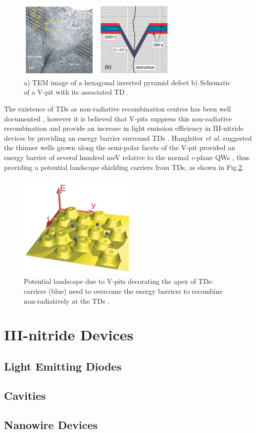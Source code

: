 \begin{figure}[h]
	\centering
	\includegraphics[width=0.7\textwidth]{Figs/Ch1/vpit.png}
	\caption {a) TEM image of a hexagonal inverted pyramid defect b) Schematic  of a V-pit with its associated TD \cite{Hangleiter2005}.}
	\label{1.8}
\end{figure}
\FloatBarrier 

The existence of TDs as non-radiative recombination centres has been well documented \cite{Bennett2010b}, however it is believed that V-pits suppress this non-radiative recombination and provide an increase in light emission efficiency in III-nitride devices by providing an energy barrier surround TDs \cite{Hangleiter2005}. Hangleiter {\it et al}. suggested the thinner wells grown along the semi-polar facets of the V-pit provided an energy barrier of several hundred meV relative to the normal {\it c}-plane QWs \cite{Hangleiter2005}, thus providing a potential landscape shielding carriers from TDs, as shown in Fig.\ref{1.9}.

\begin{figure}[h]
	\centering
	\includegraphics[width=0.5\textwidth]{Figs/Ch1/landscape.png}
	\caption {Potential landscape due to V-pits decorating the apex of TDs: carriers (blue) need to overcome the energy barriers to recombine non-radiatively at the TDs \cite{Hangleiter2005}.}
	\label{1.9}
\end{figure}
\FloatBarrier 

 
\section{III-nitride Devices } %
\subsection{Light Emitting Diodes}

\subsection{Cavities}


\subsection{Nanowire Devices}

